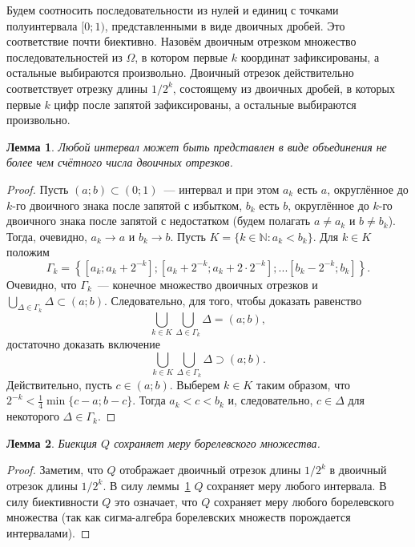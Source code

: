 \documentclass[a4paper,14pt]{article} %
\theoremstyle{plain}
\newtheorem{lemma}{Лемма}%
\begin{document}
Будем соотносить последовательности из нулей и единиц
с точками полуинтервала $[0;1)$, представленными в виде двоичных дробей.
Это соответствие почти биективно.
Назовём двоичным отрезком множество последовательностей из $\Omega$,
в котором первые $k$ координат зафиксированы, а остальные выбираются произвольно.
Двоичный отрезок действительно соответствует отрезку длины $1/2^k$,
состоящему из двоичных дробей, в которых первые $k$ цифр после запятой зафиксированы,
а остальные выбираются произвольно.


\begin{lemma}
	\label{lem:binary_intervals}
	Любой интервал может быть представлен в виде объединения не более чем счётного числа
	двоичных отрезков.
\end{lemma}

\begin{proof}
	Пусть $(a;b) \subset (0;1)$~--- интервал и при этом $a_k$ есть $a$,
	округлённое до $k$-го двоичного знака после запятой с избытком,
	$b_k$ есть $b$, округлённое до $k$-го двоичного знака после запятой с недостатком
	(будем полагать $a \neq a_k$ и $b\neq b_k$).
	Тогда, очевидно, $a_k\to a$ и $b_k \to b$.
	Пусть $K=\{k\in\mathbb{N}:a_k < b_k\}$.
	Для $k\in K$ положим
	\begin{equation}
		\Gamma_k = \left\{
			[ a_k    ; a_k+2^{-k} ];
			[ a_k+2^{-k}; a_k+2 \cdot 2^{-k} ];
			...
			[ b_k-2^{-k} ; b_k ]
		\right\}
		.
	\end{equation}
	Очевидно, что $\Gamma_k$~--- конечное множество двоичных отрезков
	и $\bigcup_{\Delta \in \Gamma_k} \Delta \subset (a; b)$.
	Следовательно, для того, чтобы доказать равенство
	\begin{equation}
		\bigcup_{k\in K} \bigcup_{\Delta \in \Gamma_k} \Delta = (a;b)
		,
	\end{equation}
	достаточно доказать включение
	\begin{equation}
		\bigcup_{k\in K} \bigcup_{\Delta \in \Gamma_k} \Delta \supset (a;b)
		.
	\end{equation}
	Действительно, пусть $c\in(a;b)$.
	Выберем $k\in K$ таким образом, что
	$2^{-k} < \frac{1}{4} \min\{c-a; b-c\}$.
	Тогда $a_k < c < b_k$ и, следовательно, $c\in\Delta$ для некоторого $\Delta\in \Gamma_k$.
\end{proof}

\begin{lemma}
	Биекция $Q$ сохраняет меру борелевского множества.
\end{lemma}

\begin{proof}

	Заметим, что $Q$ отображает двоичный отрезок длины $1/2^k$ в двоичный отрезок длины $1/2^k$.
	В силу леммы~\ref{lem:binary_intervals} $Q$ сохраняет меру любого интервала.
	В силу биективности $Q$ это означает, что $Q$ сохраняет меру любого борелевского множества
	(так как сигма-алгебра борелевских множеств порождается интервалами).
\end{proof}
\end{document}
